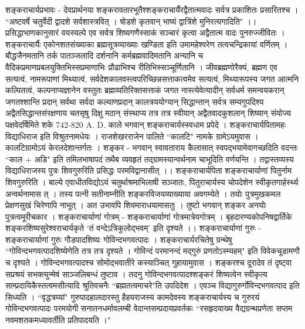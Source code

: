 शङ्कराचार्यप्रभावः -
देवप्रार्थनया शङ्करावतारभूतैश्शङ्कराचार्यैरद्वैतात्मवादः सर्वत्र प्रकाशितः प्रसारितश्च ।
``अष्टवर्षे चतुर्वेदी द्वादशे सर्वशास्त्रवित् ।
षोडशे कृतवान् भाष्यं द्वात्रिंशे मुनिरत्यगादिति" ।।
प्रसिद्धाभाणकानुसारं वयस्यल्पे एव सर्वत्र शिष्यगणैस्साकं सञ्चारं कृत्वा अद्वैतात्म वादः पुनरुज्जीवितः । शङ्कराचार्यैः एकोनशतसंख्याका ब्रह्मसूत्रव्याख्याः खण्डिता इति उमामहेश्वरेण तत्वचन्द्रिकायां वर्णितम् । बौद्धजैनमतानि तर्क पातञ्जलादि दर्शनानि कर्मब्रह्मवादिमतानि अन्यानि च वैदिकप्रमाणप्रबलयुक्तिभिस्सप्रमाणाभिः प्रौढाभिश्च रीतिभिस्सञ्चूर्णितानि ।
जीवब्रह्मणोरैक्यं, ब्रह्मण एव सत्यत्वं, नामरूपाणां मिथ्यात्वं, सर्वदेशकालवस्त्वपरिच्छिन्नसत्ताकत्वमेव सत्यत्वं, मिथ्यारूपस्य जगत आत्मनि कल्पितत्वं, कल्पनाप्यज्ञानेन वस्तुतः ब्रह्मव्यतिरिक्तसत्ताकं जगत नास्त्येवेत्यादीन् सर्वधर्म समन्वयकरान् जगतश्शान्ति प्रदान् सर्वथा सर्वदा कल्याणप्रदान् कालत्रययोग्यान् सिद्धान्तान् सर्वत्र सम्यगुपदिश्य अद्वैतसिद्धान्तसंरक्षणाय चतसृषु दिक्षु मठान् संस्थाप्य तत्र तत्र स्वीयान् अद्वैतवादकुशलान् शिष्यान् संयोज्य पक्षवेदर्षिमिते शके 742-820 A. D. काले भगवान् शङ्कराचार्यस्स्वधाम प्रपेदे ।
शङ्कराचार्यपितामहः विद्याधिराज इति विश्रुतनामधेयः । राजशेखरराजेन पालिते ``कालटि" नामके ग्रामेऽयमुवास । कालटिग्रामोऽयं केरलदेशान्तर्गतः । शङ्कर - भगवान् स्वावताराय कैलासात् स्वपद्भयामेवागच्छदिति वदन्तः ``काल + अडि" इति तमिलभाषापदं तथैब व्यवहृतं तद्ग्रामस्यान्वर्थनाम चाभूदिति वर्णयन्ति । तद्वास्तव्यस्य विद्याधिराजस्य पुत्रः शिवगुरुरिति प्रसिद्धः परमविद्वानासीत् ।।
शङ्कराचार्यपिता
शङ्कराचार्याणां पितुर्नाम शिवगुरुरिति । बाल्ये एवाधीतविद्योऽयं चतुर्थाश्रमाभिलाषी सञ्जातः, पितुराचार्यस्य चोपदेशेन स्वीकृतगार्हर्स्थ्य अन्वर्थनामास त् । तस्य पत्नी सतीनाम्नीति शङ्करविजयव्याख्याया अवगम्येते । तयोः पुत्रमुखकमल प्रेक्षणसुखं चिरेणापि नाभूत् । अत उभावपि शिवमाराधयामासतुः । तुष्टो भगवान् शङ्कर अनयोः पुत्रत्वमूरीचकार ।
शङ्कराचार्याणां गोत्रम् -
शङ्कराचार्याणां गोत्रमात्रेयगोत्रम् । बृहदारण्यकोपनिषद्वार्तिके शङ्करशिष्यसुरेश्वराचार्यकृते `तं वन्देऽत्रिकुलोद्भवम्' इति दृश्यते ।।
शङ्कराचार्याणां गुरुः -
शङ्कराचार्याणां गुरुः गौडपादशिष्यः गोविन्दभगवत्पादः । शङ्कराचार्यरचितेषु ग्रन्थेषु ``गोविन्दभगवत्पादशिष्येणेति तत्र तत्र दृश्यते । गोविन्दं परमानन्दं मद्गुरुं प्रणतोऽस्म्यहम्" इति विवेकचूडामणौ च दृश्यते । गोविन्दभगवत्पादश्च सोमोद्भवातीरे कस्याञ्चित् गुहायामुवास । शङ्करश्च दूरादेव तं दृष्ट्वा सप्रश्रयं सभक्त्युन्मेषं साञ्जलिबन्धं तुष्टाव । तदनु गोविन्दभगवत्पादश्शङ्करं शिष्यत्वेन स्वीकृत्य साम्प्रदायिकैस्तत्वमसीत्यादि श्रुतिवचनैः ``ब्रह्मतत्वमाचरे"ति उपदिदेश । एवञ्च विद्यागुरुर्गोविन्दभगवत्पाद इति सिध्यति ।
``वृद्धत्रय्यां" गुरुपादहालदारस्तु हैहयराजस्य कामदेवस्य शङ्कराचार्यस्य च गुरुरयं गोविन्दभगवत्पादः परमयोगी सनातनधर्मावलम्बी वेदान्तसम्प्रदायप्रवर्तकः ``रसहृदयाख्य वैद्यग्रन्थप्रणेता सप्तम नवमशतकमध्यावर्तीति प्रतिपादयति ।"
